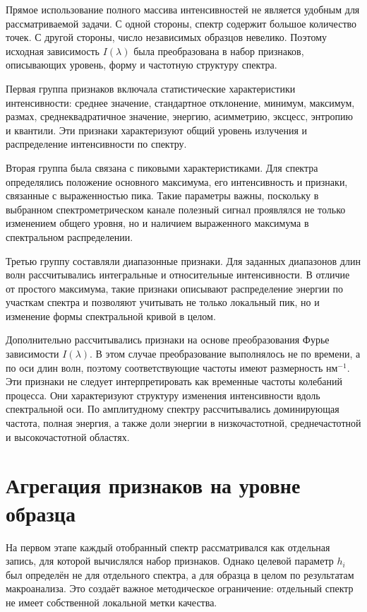 Прямое использование полного массива интенсивностей не является удобным для рассматриваемой задачи. С одной стороны, спектр содержит большое количество точек. С другой стороны, число независимых образцов невелико. Поэтому исходная зависимость \(I(\lambda)\) была преобразована в набор признаков, описывающих уровень, форму и частотную структуру спектра.

Первая группа признаков включала статистические характеристики интенсивности: среднее значение, стандартное отклонение, минимум, максимум, размах, среднеквадратичное значение, энергию, асимметрию, эксцесс, энтропию и квантили. Эти признаки характеризуют общий уровень излучения и распределение интенсивности по спектру.

Вторая группа была связана с пиковыми характеристиками. Для спектра определялись положение основного максимума, его интенсивность и признаки, связанные с выраженностью пика. Такие параметры важны, поскольку в выбранном спектрометрическом канале полезный сигнал проявлялся не только изменением общего уровня, но и наличием выраженного максимума в спектральном распределении.

Третью группу составляли диапазонные признаки. Для заданных диапазонов длин волн рассчитывались интегральные и относительные интенсивности. В отличие от простого максимума, такие признаки описывают распределение энергии по участкам спектра и позволяют учитывать не только локальный пик, но и изменение формы спектральной кривой в целом.

Дополнительно рассчитывались признаки на основе преобразования Фурье зависимости \(I(\lambda)\). В этом случае преобразование выполнялось не по времени, а по оси длин волн, поэтому соответствующие частоты имеют размерность \(\text{нм}^{-1}\). Эти признаки не следует интерпретировать как временные частоты колебаний процесса. Они характеризуют структуру изменения интенсивности вдоль спектральной оси. По амплитудному спектру рассчитывались доминирующая частота, полная энергия, а также доли энергии в низкочастотной, среднечастотной и высокочастотной областях.

\section{Агрегация признаков на уровне образца}

На первом этапе каждый отобранный спектр рассматривался как отдельная запись, для которой вычислялся набор признаков. Однако целевой параметр \(h_i\) был определён не для отдельного спектра, а для образца в целом по результатам макроанализа. Это создаёт важное методическое ограничение: отдельный спектр не имеет собственной локальной метки качества.

